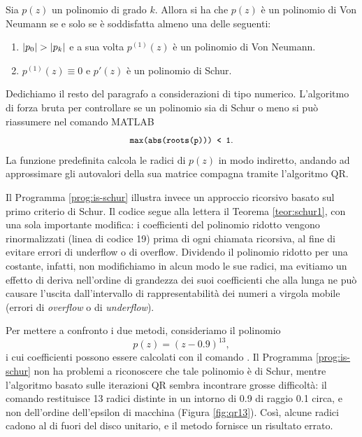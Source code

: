 \begin{teor} \label{teor:schur2}
Sia $p(z)$ un polinomio di grado $k$. Allora si ha che $p(z)$ è un polinomio
di Von Neumann se e solo se è soddisfatta almeno una delle seguenti:
\begin{enumerate}
\item $\left\lvert p_0\right\rvert > \left\lvert p_k\right\rvert$ e a sua volta $p^{(1)}(z)$ è un polinomio di Von Neumann.
\item $p^{(1)}(z) \equiv 0$ e $p'(z)$ è un polinomio di Schur.
\end{enumerate}
\end{teor}

\noindent Dedichiamo il resto del paragrafo a considerazioni di tipo numerico.
L'algoritmo di forza bruta per controllare se un polinomio sia di Schur
o meno si può riassumere nel comando MATLAB
\[
\text{\code{max(abs(roots(p))) < 1}}.
\]
La funzione predefinita  calcola le radici di $p(z)$
in modo indiretto, andando ad approssimare
gli autovalori della sua matrice compagna tramite l'algoritmo QR.

Il Programma \ref{prog:is-schur} illustra invece un approccio ricorsivo
basato sul primo criterio di Schur. Il codice segue alla lettera
il Teorema \ref{teor:schur1}, con una sola importante modifica:
i coefficienti del polinomio ridotto vengono rinormalizzati
(linea di codice 19) prima di ogni chiamata ricorsiva, al fine
di evitare errori di underflow o di overflow.
Dividendo il polinomio ridotto per una costante, infatti,
non modifichiamo in alcun modo le sue radici, ma evitiamo un effetto
di deriva nell'ordine di grandezza dei suoi coefficienti che alla lunga
ne può causare l'uscita dall'intervallo di rappresentabilità
dei numeri a virgola mobile (errori di \emph{overflow} o di \emph{underflow}).

Per mettere a confronto i due metodi, consideriamo il polinomio
\[
p(z) = (z-0.9)^{13},
\]
i cui coefficienti possono essere calcolati
con il comando .
Il Programma \ref{prog:is-schur} non ha problemi a riconoscere che
tale polinomio è di Schur, mentre l'algoritmo basato sulle iterazioni
QR sembra incontrare grosse difficoltà: il comando  restituisce
13 radici distinte in un intorno di 0.9 di raggio 0.1 circa, e non dell'ordine
dell'epsilon di macchina (Figura \ref{fig:qr13}). Così, alcune radici cadono
al di fuori del disco unitario, e il metodo fornisce un risultato errato.




